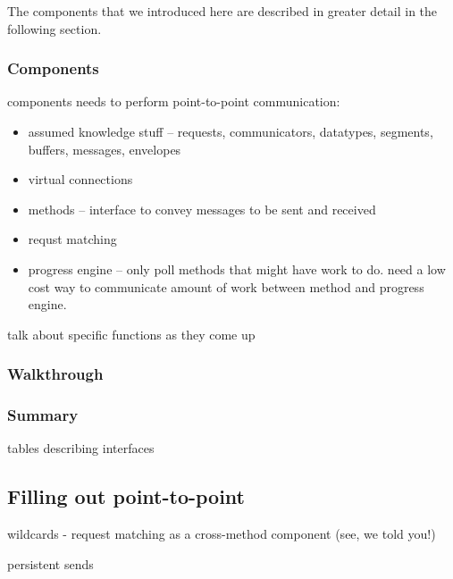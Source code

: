 \begin{comment}
  \emph{\mpifunc{MPI_TEST} and \mpifunc{MPI_WAIT} do the same thing on
    completion.  The above text needs a little cleanup to make that clear.}
\end{comment}

The components that we introduced here are described in greater detail in the
following section.

\subsubsection{Components}

components needs to perform point-to-point communication:
\begin{itemize}
\item assumed knowledge stuff -- requests, communicators, datatypes, segments, buffers, messages, envelopes
\item virtual connections
\item methods --
interface to convey messages to be sent and received
\item requst matching
\item progress engine --
only poll methods that might have work to do.  need a low cost way to
communicate amount of work between method and progress engine.
\end{itemize}

talk about specific functions as they come up

\subsubsection{Walkthrough}
\label{sssec:walkthrough}


\subsubsection{Summary}

tables describing interfaces


\subsection{Filling out point-to-point}

wildcards
- request matching as a cross-method component (see, we told you!)

persistent sends


